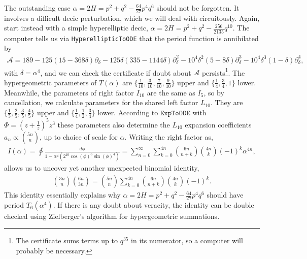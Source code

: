 \documentclass[nofootinbib,preprint]{revtex4-1}
\begin{document}
The outstanding case $\alpha=2H=p^2+q^2-\frac{64}{27}p^{4}q^{6}$ should not 
be forgotten. It involves a difficult decic perturbation, which we will deal with 
circuitously. Again, start instead with a simple hyperelliptic decic, 
$\alpha =2H=p^2+q^2-\frac{256}{2135}q^{10}$. The computer tells us via 
\texttt{HyperellipticToODE} that the period function is annihilated by
\begin{eqnarray}
\mathcal{A}=189 - 125 (15 - 368 \delta)\partial_{\delta} - 125 \delta (335 - 1144 \delta)\partial_{\delta}^2 
- 10^4 \delta^2 (5 - 8 \delta)\partial_{\delta}^3 - 10^4 \delta^3(1 - \delta)\partial_{\delta}^4, \nonumber 
\end{eqnarray}
with $\delta=\alpha^4$, and we can check the certificate if doubt about $\mathcal{A}$ 
persists\footnote{The certificate sums terms up to $q^{35}$ in its numerator,
so a computer will probably be necessary.}. The hypergeometric parameters of $T(\alpha)$ are $\{\frac{1}{10},\frac{3}{10},\frac{7}{10},\frac{9}{10}\}$ upper and 
$\{\frac{1}{4},\frac{3}{4},1\}$ lower. Meanwhile, the parameters of right
factor $I_{10}$ are the same as $I_5$, so by cancellation, we calculate
parameters for the shared left factor $L_{10}$. They are 
$\{\frac{1}{5},\frac{2}{5},\frac{3}{5},\frac{4}{5}\}$ upper and
$\{\frac{1}{4},\frac{1}{2},\frac{3}{4}\}$ lower. According to 
$\texttt{ExpToODE}$ with $\Phi=(z+\frac{1}{z})^5 z^3$ these parameters also 
determine the $L_{10}$ expansion coefficients $a_n\propto\binom{5n}{n}$, 
up to choice of scale for $\alpha$. Writing the right factor as,
\begin{eqnarray}
I(\alpha) = \oint \frac{d\phi}{1-\alpha^4(2^{10}\cos(\phi)^6\sin(\phi)^4)}
=\sum_{n=0}^{\infty}\sum_{k=0}^{4n} \binom{6n}{n+k}\binom{4n}{k}(-1)^k \alpha^{4n}, \nonumber
\end{eqnarray}\FloatBarrier 
\noindent allows us to uncover yet another unexpected binomial identity,
\begin{eqnarray}
\binom{3n}{n}\binom{6n}{3n}
=\binom{5n}{n}\sum_{k=0}^{4n} \binom{6n}{n+k}\binom{4n}{k}(-1)^k. \nonumber
\end{eqnarray}
This identity essentially explains why $\alpha=2H=p^2+q^2-\frac{64}{27}p^{4}q^{6}$ 
should have period $T_6(\alpha^4)$. If there is any doubt about veracity, 
the identity can be double checked using Zielberger's algorithm for 
hypergeometric summations. 
\end{document}
